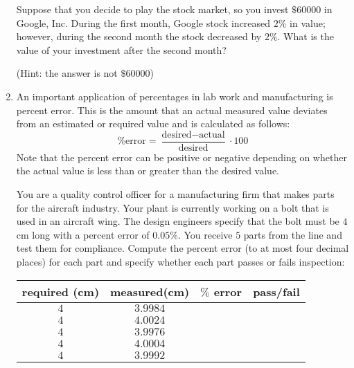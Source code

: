 \documentclass[letterpaper,12pt,fleqn]{article}
\begin{document}
\begin{enumerate}
  Suppose that you decide to play the stock market, so you invest $\$60000$ in
  Google, Inc. During the first month, Google stock increased $2\%$ in value;
  however, during the second month the stock decreased by $2\%$. What is the
  value of your investment after the second month?

  (Hint: the answer is not $\$60000$)

\item An important application of percentages in lab work and manufacturing is
  percent error. This is the amount that an actual measured value deviates from
  an estimated or required value and is calculated as follows:
  \[\%\mbox{error}=\frac{\mbox{desired}-\mbox{actual}}{\mbox{desired}}\cdot100\]
  Note that the percent error can be positive or negative depending on whether
  the actual value is less than or greater than the desired value.

  You are a quality control officer for a manufacturing firm that makes parts
  for the aircraft industry. Your plant is currently working on a bolt that is
  used in an aircraft wing. The design engineers specify that the bolt must be
  $4$ cm long with a percent error of $0.05\%$. You receive $5$ parts from the
  line and test them for compliance. Compute the percent error (to at most
  four decimal places) for each part and specify whether each part passes or
  fails inspection: 

  \begin{tabular}{|c|c|c|c|}
    \hline
    required (cm) & measured(cm) & $\%$ error & pass/fail \\
    \hline
    $4$ & $3.9984$ & & \\
    \hline
    $4$ & $4.0024$ & & \\
    \hline
    $4$ & $3.9976$ & & \\
    \hline
    $4$ & $4.0004$ & & \\
    \hline
    $4$ & $3.9992$ & & \\
    \hline
  \end{tabular}
\end{enumerate}
\end{document}
